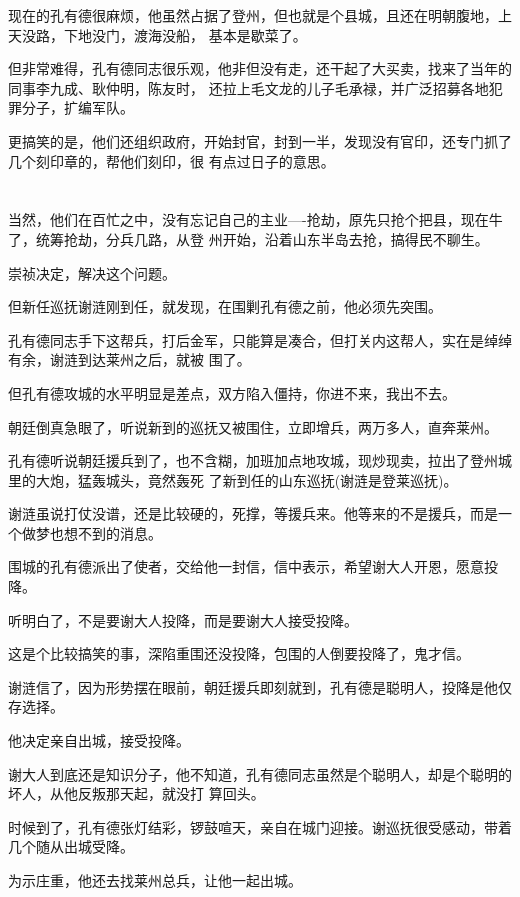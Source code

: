 \documentclass[11pt,a4paper,onecolumn]{article}
\begin{document}
现在的孔有德很麻烦，他虽然占据了登州，但也就是个县城，且还在明朝腹地，上天没路，下地没门，渡海没船，
基本是歇菜了。

但非常难得，孔有德同志很乐观，他非但没有走，还干起了大买卖，找来了当年的同事李九成、耿仲明，陈友时，
还拉上毛文龙的儿子毛承禄，并广泛招募各地犯罪分子，扩编军队。

更搞笑的是，他们还组织政府，开始封官，封到一半，发现没有官印，还专门抓了几个刻印章的，帮他们刻印，很
有点过日子的意思。

\section[\thesection]{}

当然，他们在百忙之中，没有忘记自己的主业----抢劫，原先只抢个把县，现在牛了，统筹抢劫，分兵几路，从登
州开始，沿着山东半岛去抢，搞得民不聊生。

崇祯决定，解决这个问题。

但新任巡抚谢涟刚到任，就发现，在围剿孔有德之前，他必须先突围。

孔有德同志手下这帮兵，打后金军，只能算是凑合，但打关内这帮人，实在是绰绰有余，谢涟到达莱州之后，就被
围了。

但孔有德攻城的水平明显是差点，双方陷入僵持，你进不来，我出不去。

朝廷倒真急眼了，听说新到的巡抚又被围住，立即增兵，两万多人，直奔莱州。

孔有德听说朝廷援兵到了，也不含糊，加班加点地攻城，现炒现卖，拉出了登州城里的大炮，猛轰城头，竟然轰死
了新到任的山东巡抚(谢涟是登莱巡抚)。

谢涟虽说打仗没谱，还是比较硬的，死撑，等援兵来。他等来的不是援兵，而是一个做梦也想不到的消息。

围城的孔有德派出了使者，交给他一封信，信中表示，希望谢大人开恩，愿意投降。

听明白了，不是要谢大人投降，而是要谢大人接受投降。

这是个比较搞笑的事，深陷重围还没投降，包围的人倒要投降了，鬼才信。

谢涟信了，因为形势摆在眼前，朝廷援兵即刻就到，孔有德是聪明人，投降是他仅存选择。

他决定亲自出城，接受投降。

谢大人到底还是知识分子，他不知道，孔有德同志虽然是个聪明人，却是个聪明的坏人，从他反叛那天起，就没打
算回头。

时候到了，孔有德张灯结彩，锣鼓喧天，亲自在城门迎接。谢巡抚很受感动，带着几个随从出城受降。

为示庄重，他还去找莱州总兵，让他一起出城。
\end{document}
